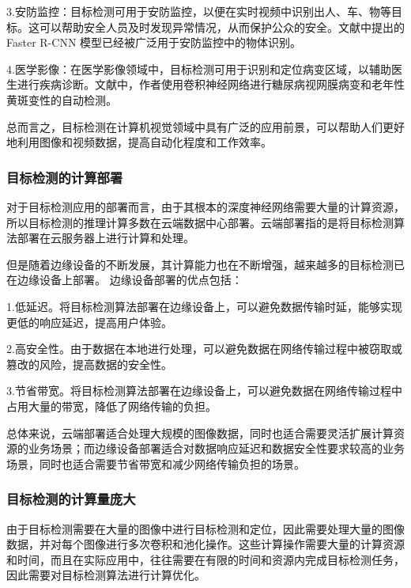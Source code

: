 \documentclass{ctexart}
\numberwithin{equation}{section}%
\numberwithin{figure}{section}%
\numberwithin{table}{section}%
\begin{document}
	3.安防监控：目标检测可用于安防监控，以便在实时视频中识别出人、车、物等目标。这可以帮助安全人员及时发现异常情况，从而保护公众的安全。文献\textsuperscript{\cite{3}}中提出的 Faster R-CNN 模型已经被广泛用于安防监控中的物体识别。
	
	4.医学影像：在医学影像领域中，目标检测可用于识别和定位病变区域，以辅助医生进行疾病诊断。文献\textsuperscript{\cite{4}}中，作者使用卷积神经网络进行糖尿病视网膜病变和老年性黄斑变性的自动检测。
	
	总而言之，目标检测在计算机视觉领域中具有广泛的应用前景，可以帮助人们更好地利用图像和视频数据，提高自动化程度和工作效率。
	\subsubsection{目标检测的计算部署}
	对于目标检测应用的部署而言，由于其根本的深度神经网络需要大量的计算资源，所以目标检测的推理计算多数在云端数据中心部署\textsuperscript{\cite{5}}。云端部署指的是将目标检测算法部署在云服务器上进行计算和处理。
	
	但是随着边缘设备的不断发展，其计算能力也在不断增强，越来越多的目标检测已在边缘设备上部署。
	边缘设备部署的优点包括：
	
	1.低延迟。将目标检测算法部署在边缘设备上，可以避免数据传输时延，能够实现更低的响应延迟，提高用户体验。
	
	2.高安全性。由于数据在本地进行处理，可以避免数据在网络传输过程中被窃取或篡改的风险，提高数据的安全性。
	
	3.节省带宽。将目标检测算法部署在边缘设备上，可以避免数据在网络传输过程中占用大量的带宽，降低了网络传输的负担。
	
	总体来说，云端部署适合处理大规模的图像数据，同时也适合需要灵活扩展计算资源的业务场景；而边缘设备部署适合对数据响应延迟和数据安全性要求较高的业务场景，同时也适合需要节省带宽和减少网络传输负担的场景。
	
	\subsubsection{目标检测的计算量庞大}
	由于目标检测需要在大量的图像中进行目标检测和定位，因此需要处理大量的图像数据，并对每个图像进行多次卷积和池化操作。这些计算操作需要大量的计算资源和时间，而且在实际应用中，往往需要在有限的时间和资源内完成目标检测任务，因此需要对目标检测算法进行计算优化。
	
\end{document}
